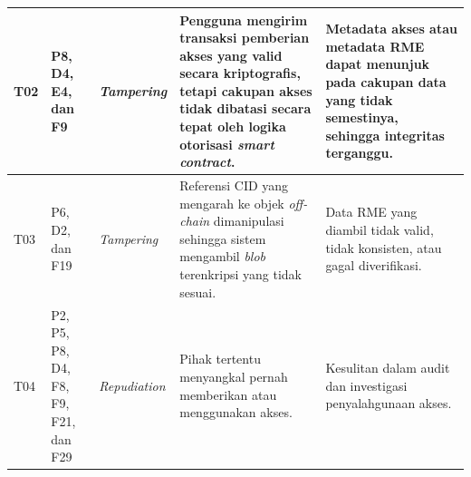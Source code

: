 {\begin{longtable}{|p{0.65cm}|p{2.2cm}|p{1.9cm}|p{4cm}|p{4cm}|}
	T02                                                                                                                                                                         &
	P8, D4, E4, dan F9                                                                                                                                                          &
	\textit{Tampering}                                                                                                                                                          &
	Pengguna mengirim transaksi pemberian akses yang valid secara kriptografis, tetapi cakupan akses tidak dibatasi secara tepat oleh logika otorisasi \textit{smart contract}. &
	Metadata akses atau metadata RME dapat menunjuk pada cakupan data yang tidak semestinya, sehingga integritas terganggu.                                                                                                                                                  \\
	\hline

	T03                                                                                                                                                                         &
	P6, D2, dan F19                                                                                                                                                             &
	\textit{Tampering}                                                                                                                                                          &
	Referensi CID yang mengarah ke objek \textit{off-chain} dimanipulasi sehingga sistem mengambil \textit{blob} terenkripsi yang tidak sesuai.                                 &
	Data RME yang diambil tidak valid, tidak konsisten, atau gagal diverifikasi.                                                                                                                                                                                             \\
	\hline

	T04                                                                                                                                                                         &
	P2, P5, P8, D4, F8, F9, F21, dan F29                                                                                                                                        &
	\textit{Repudiation}                                                                                                                                                        &
	Pihak tertentu menyangkal pernah memberikan atau menggunakan akses.                                                                                                         &
	Kesulitan dalam audit dan investigasi penyalahgunaan akses.                                                                                                                                                                                                              \\
	\hline


\end{longtable}}
